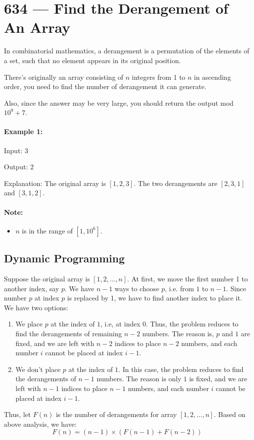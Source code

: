 \section{634 --- Find the Derangement of An Array}
In combinatorial mathematics, a derangement is a permutation of the elements of a set, such that no element appears in its original position.

There's originally an array consisting of $n$ integers from 1 to $n$ in ascending order, you need to find the number of derangement it can generate.

Also, since the answer may be very large, you should return the output mod $10^9 + 7$.

\paragraph{Example 1:}

\begin{flushleft}
Input: 3

Output: 2

Explanation: The original array is $ [1,2,3] $. The two derangements are $[2,3,1]$ and $[3,1,2]$.
\end{flushleft}
\paragraph{Note:}
\begin{itemize}
\item $n$ is in the range of $[1, 10^6]$. 
\end{itemize}

\subsection{Dynamic Programming}
Suppose the original array is $[1,2,\ldots, n]$. At first, we move the first number 1 to another index, say $p$. We have $n-1$ ways to choose $p$, i.e. from $1$ to $n-1$. Since number $p$ at index $p$ is replaced by 1, we have to find another index to place it. We have two options:

\begin{enumerate}
\item We place $p$ at the index of $1$, i.e, at index 0. Thus, the problem reduces to find the derangements of remaining $n-2$ numbers. The reason is, $p$ and $1$ are fixed, and we are left with $n-2$ indices to place $n-2$ numbers, and each number $i$ cannot be placed at index $i-1$.
\item We don't place $p$ at the index of $1$. In this case, the problem reduces to find the derangements of $n-1$ numbers. The reason is only $1$ is fixed, and we are left with $n-1$ indices to place $n-1$ numbers, and each number $i$ cannot be placed at index $i-1$.
\end{enumerate} 

Thus, let $F(n)$ is the number of derangements for array $[1,2,\ldots, n]$. Based on above analysis, we have:
\[
F(n) = (n-1)\times(F(n-1)+F(n-2))
\]